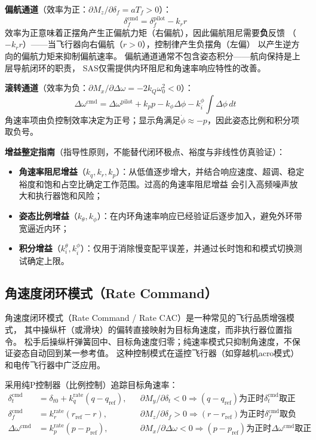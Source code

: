 \textbf{偏航通道}（效率为正：$\partial M_z / \partial \delta_f = a T_f > 0$）：
\begin{equation}
    \delta_f^{\text{cmd}} = \delta_f^{\text{pilot}}
    - k_r r
    \label{eq:sas_yaw}
\end{equation}
效率为正意味着正摆角产生正偏航力矩（右偏航），因此偏航阻尼需要\textbf{负}反馈
（$-k_r r$）——当飞行器向右偏航（$r > 0$），控制律产生负摆角（左偏）
以产生逆方向的偏航力矩来抑制偏航速率。
偏航通道通常不包含姿态积分——航向保持是上层导航闭环的职责，
SAS仅需提供内环阻尼和角速率响应特性的改善。

\textbf{滚转通道}（效率为负：$\partial M_x / \partial \Delta\omega = -2k_Q \omega_0^2 < 0$）：
\begin{equation}
    \Delta\omega^{\text{cmd}} = \Delta\omega^{\text{pilot}}
    + k_p p - k_\phi \Delta\phi
    - k_i^\phi \int \Delta\phi \, dt
    \label{eq:sas_roll}
\end{equation}
角速率项由负控制效率决定为正号；显示角满足$\dot\phi\approx-p$，因此姿态比例和积分项取负号。

\textbf{增益整定指南}（指导性原则，不能替代闭环极点、裕度与非线性仿真验证）：
\begin{itemize}
    \item \textbf{角速率阻尼增益}（$k_q, k_r, k_p$）：从低值逐步增大，并结合响应速度、超调、稳定裕度和饱和占空比确定工作范围。过高的角速率阻尼增益
          会引入高频噪声放大和执行器饱和风险；
    \item \textbf{姿态比例增益}（$k_\theta, k_\phi$）：在内环角速率响应已经验证后逐步加入，避免外环带宽逼近内环；
    \item \textbf{积分增益}（$k_i^\theta, k_i^\phi$）：仅用于消除慢变配平误差，并通过长时饱和和模式切换测试确定上限。
\end{itemize}

\subsection{角速度闭环模式（Rate Command）}

角速度闭环模式（Rate Command / Rate CAC）是一种常见的飞行品质增强模式，
其中操纵杆（或滑块）的偏转直接映射为目标角速度，而非执行器位置指令。
松手后操纵杆弹簧回中、目标角速度归零；纯速率模式只抑制角速度，不保证姿态自动回到某一参考值。
这种控制模式在遥控飞行器（如穿越机acro模式）和电传飞行器中广泛应用。

采用纯P控制器（比例控制）追踪目标角速率：
\begin{align}
    \delta_t^{\text{cmd}} &= \delta_{t0}+k_q^{\text{rate}} (q - q_{\text{ref}}),
    &&\partial M_y / \partial \delta_t < 0 \Rightarrow (q - q_{\text{ref}})
    \text{为正时} \delta_t^{\text{cmd}} \text{取正} \\
    \delta_f^{\text{cmd}} &= k_r^{\text{rate}} (r_{\text{ref}} - r),
    &&\partial M_z / \partial \delta_f > 0 \Rightarrow (r - r_{\text{ref}})
    \text{为正时} \delta_f^{\text{cmd}} \text{取负} \\
    \Delta\omega^{\text{cmd}} &= k_p^{\text{rate}} (p - p_{\text{ref}}),
    &&\partial M_x / \partial \Delta\omega < 0 \Rightarrow (p - p_{\text{ref}})
    \text{为正时} \Delta\omega^{\text{cmd}} \text{取正}
    \label{eq:rate_command}
\end{align}

